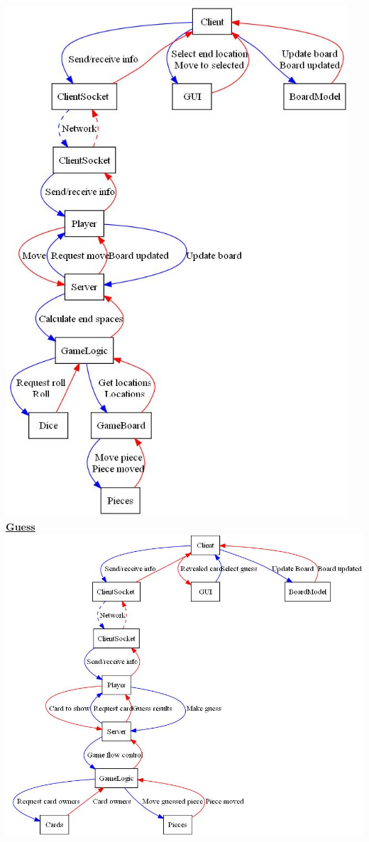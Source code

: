 \begin{flushleft}
	\includegraphics[height=7.5in]{../DesignDocumentation/06_ClassCollaborationDiagrams/move_REV02.jpg}
	\newpage
	{\LARGE \underline{\textbf{Guess}}} \\
	\includegraphics[width=6in]{../DesignDocumentation/06_ClassCollaborationDiagrams/guess_REV02.jpg}

\end{flushleft}
